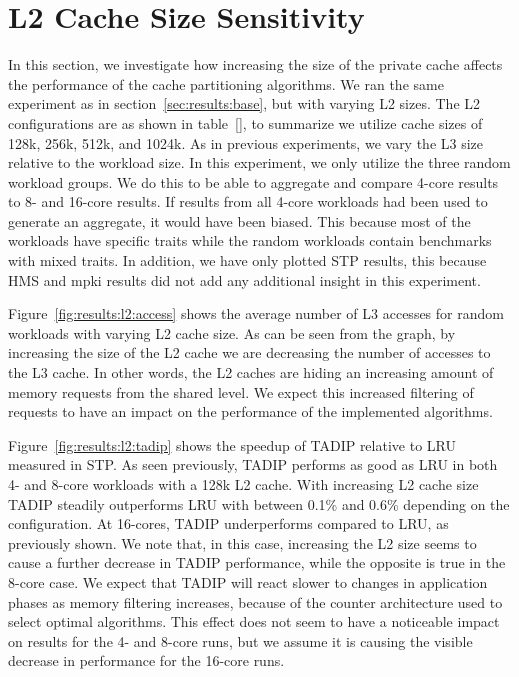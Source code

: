 \section{L2 Cache Size Sensitivity}
\label{sec:results:l2size_sensitivity}

In this section, we investigate how increasing the size of the private cache affects the performance of the cache partitioning algorithms.
We ran the same experiment as in section~\ref{sec:results:base}, but with varying L2 sizes.
The L2 configurations are as shown in table~\ref{}\todo{}, to summarize we utilize cache sizes of 128k, 256k, 512k, and 1024k.
As in previous experiments, we vary the L3 size relative to the workload size.
In this experiment, we only utilize the three random workload groups.
We do this to be able to aggregate and compare 4-core results to 8- and 16-core results.
If results from all 4-core workloads had been used to generate an aggregate, it would have been biased.
This because most of the workloads have specific traits while the random workloads contain benchmarks with mixed traits.
In addition, we have only plotted STP results, this because HMS and mpki results did not add any additional insight in this experiment.

Figure~\ref{fig:results:l2:access} shows the average number of L3 accesses for random workloads with varying L2 cache size.
As can be seen from the graph, by increasing the size of the L2 cache we are decreasing the number of accesses to the L3 cache.
In other words, the L2 caches are hiding an increasing amount of memory requests from the shared level.
We expect this increased filtering of requests to have an impact on the performance of the implemented algorithms.

Figure~\ref{fig:results:l2:tadip} shows the speedup of TADIP relative to LRU measured in STP. 
As seen previously, TADIP performs as good as LRU in both 4- and 8-core workloads with a 128k L2 cache.
With increasing L2 cache size TADIP steadily outperforms LRU with between 0.1\% and 0.6\% depending on the configuration. 
At 16-cores, TADIP underperforms compared to LRU, as previously shown.
We note that, in this case, increasing the L2 size seems to cause a further decrease in TADIP performance, while the opposite is true in the 8-core case.
We expect that TADIP will react slower to changes in application phases as memory filtering increases, because of the counter architecture used to select optimal algorithms.
This effect does not seem to have a noticeable impact on results for the 4- and 8-core runs, but we assume it is causing the visible decrease in performance for the 16-core runs.

